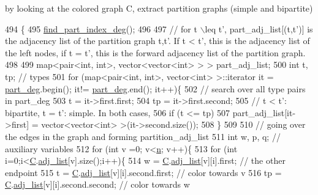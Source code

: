 by looking at the colored graph C, extract partition graphs (simple and bipartite) 


\begin{DoxyCode}
494 \{
495   \hyperlink{classmarked__graph__encoder_a1cb2cd754108302a0437a924dc70bc0e}{find\_part\_index\_deg}();
496 
497   \textcolor{comment}{// for t \(\backslash\)leq t', part\_adj\_list[(t,t')] is the adjacency list of the partition graph t,t'. If t < t',
       this is the adjacency list of the left nodes, if t = t', this is the forward adjacency list of the partition
       graph.}
498 
499   map<pair<int, int>, vector<vector<int> > > part\_adj\_list;
500   \textcolor{keywordtype}{int} t, tp; \textcolor{comment}{// types }
501   \textcolor{keywordflow}{for} (map<pair<int, int>, vector<int> >::iterator it = \hyperlink{classmarked__graph__encoder_a55ea2edb2609dfc287432f61900d6ad1}{part\_deg}.begin(); it!= 
      \hyperlink{classmarked__graph__encoder_a55ea2edb2609dfc287432f61900d6ad1}{part\_deg}.end(); it++)\{
502     \textcolor{comment}{// search over all type pairs in part\_deg}
503     t = it->first.first;
504     tp = it->first.second;
505     \textcolor{comment}{// t < t': bipartite, t = t': simple. In both cases, }
506     \textcolor{keywordflow}{if} (t <= tp)
507       part\_adj\_list[it->first] = vector<vector<int> >(it->second.size());
508   \}
509 
510   \textcolor{comment}{// going over the edges in the graph and forming partition\_adj\_list}
511   \textcolor{keywordtype}{int} w, p, q; \textcolor{comment}{// auxiliary variables }
512   \textcolor{keywordflow}{for} (\textcolor{keywordtype}{int} v =0; v<\hyperlink{classmarked__graph__encoder_a4c66d9fdbc14c97523715aac7e4511cb}{n}; v++)\{
513     \textcolor{keywordflow}{for} (\textcolor{keywordtype}{int} i=0;i<\hyperlink{classmarked__graph__encoder_af82bc0653414091291cb75553a407bdb}{C}.\hyperlink{classcolored__graph_a45dce16965079286cf3f41a54a1b2ea4}{adj\_list}[v].size();i++)\{
514       w = \hyperlink{classmarked__graph__encoder_af82bc0653414091291cb75553a407bdb}{C}.\hyperlink{classcolored__graph_a45dce16965079286cf3f41a54a1b2ea4}{adj\_list}[v][i].first; \textcolor{comment}{// the other endpoint}
515       t = \hyperlink{classmarked__graph__encoder_af82bc0653414091291cb75553a407bdb}{C}.\hyperlink{classcolored__graph_a45dce16965079286cf3f41a54a1b2ea4}{adj\_list}[v][i].second.first; \textcolor{comment}{// color towards v}
516       tp = \hyperlink{classmarked__graph__encoder_af82bc0653414091291cb75553a407bdb}{C}.\hyperlink{classcolored__graph_a45dce16965079286cf3f41a54a1b2ea4}{adj\_list}[v][i].second.second; \textcolor{comment}{// color towards w}

\end{DoxyCode}
